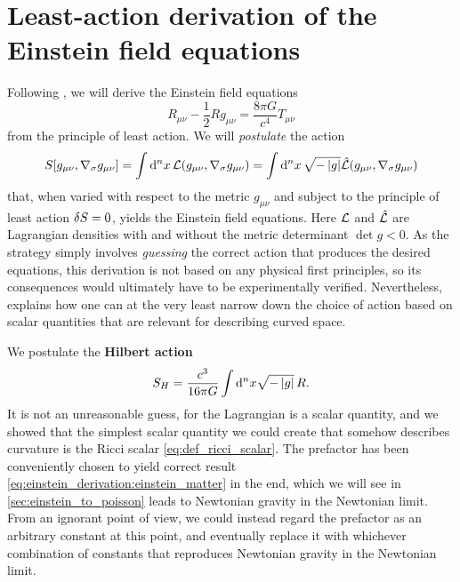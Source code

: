 \section{Least-action derivation of the Einstein field equations}
\label{sec:einstein_derivation}

Following \cite[section 4.3]{ref:carroll}, we will derive the Einstein field equations
\begin{equation}
	R_{\mu \nu} - \frac{1}{2} R g_{\mu \nu} = \frac{8 \pi G}{c^4} T_{\mu \nu}
\end{equation}
from the principle of least action.
We will \emph{postulate} the action
\begin{equation}
	S[g_{\mu \nu}, \nabla_\sigma g_{\mu \nu}] = \int \mathop{}\!\mathrm{d}^n x \, \mathcal{L}(g_{\mu \nu}, \nabla_\sigma g_{\mu \nu})
	                                          = \int \mathop{}\!\mathrm{d}^n x \, \sqrt{-\left\lvert g \right\rvert} \hat{\mathcal{L}}(g_{\mu \nu}, \nabla_\sigma g_{\mu \nu})
\end{equation}
that, when varied with respect to the metric $g_{\mu \nu}$ and subject to the principle of least action $\delta S = 0$, yields the Einstein field equations.
Here $\mathcal{L}$ and $\hat{\mathcal{L}}$ are Lagrangian densities with and without the metric determinant $\det{g} < 0$.
As the strategy simply involves \emph{guessing} the correct action that produces the desired equations, this derivation is not based on any physical first principles, so its consequences would ultimately have to be experimentally verified.
Nevertheless, \cite[page 160-161]{ref:carroll} explains how one can at the very least narrow down the choice of action based on scalar quantities that are relevant for describing curved space.

We postulate the \textbf{Hilbert action}
\begin{equation}
	S_H = \frac{c^3}{16 \pi G} \int \mathop{}\!\mathrm{d}^n x \sqrt{-\left\lvert g \right\rvert} \, R .
	\label{eq:einstein_derivation:hilbert_action}
\end{equation}
It is not an unreasonable guess, for the Lagrangian is a scalar quantity, and we showed that the simplest scalar quantity we could create that somehow describes curvature is the Ricci scalar \eqref{eq:def_ricci_scalar}.
The prefactor has been conveniently chosen to yield correct result \eqref{eq:einstein_derivation:einstein_matter} in the end, which we will see in \cref{sec:einstein_to_poisson} leads to Newtonian gravity in the Newtonian limit.
From an ignorant point of view, we could instead regard the prefactor as an arbitrary constant at this point, and eventually replace it with whichever combination of constants that reproduces Newtonian gravity in the Newtonian limit.

